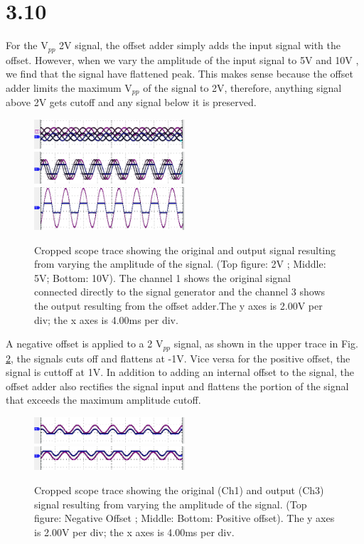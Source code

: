 \documentclass[authoryear, 12pt,5p, times]{elsarticle}
\begin{document}
\section*{3.10}
For the V$_{pp}$ 2V signal, the offset adder simply adds the input signal with the offset. However, when we vary the amplitude of the input signal to 5V and 10V , we find that the signal have flattened peak. This makes sense because the offset adder limits the maximum V$_{pp}$ of the signal to 2V, therefore, anything signal above 2V gets cutoff and any signal below it is preserved. 
\begin{figure}[h!]
\center
\includegraphics[width=0.5\textwidth]{figure/3_10_12}
\includegraphics[width=0.5\textwidth]{figure/3_10_13}
\includegraphics[width=0.5\textwidth]{figure/3_10_14}
\caption{Cropped scope trace showing the original and output signal resulting from varying the amplitude of the signal. (Top figure: 2V ; Middle: 5V; Bottom: 10V). The channel 1 shows the original signal connected directly to the signal generator and the channel 3 shows the output resulting from the offset adder.The y axes is 2.00V per div; the x axes is 4.00ms per div.}
\label{3_10_12}
\end{figure}
\par A negative offset is applied to a 2 V$_{pp}$ signal, as shown in the upper trace in Fig. \ref{plus_neg}, the signals cuts off and flattens at -1V.  Vice versa for the positive offset, the signal is cuttoff at 1V. In addition to adding an internal offset to the signal, the offset adder also rectifies the signal input and flattens the portion of the signal that exceeds the maximum amplitude cutoff. 
\begin{figure}[h!]
\center
\includegraphics[width=0.5\textwidth]{figure/3_10_17}
\includegraphics[width=0.5\textwidth]{figure/3_10_16}
\caption{Cropped scope trace showing the original (Ch1) and output (Ch3) signal resulting from varying the amplitude of the signal. (Top figure: Negative Offset ; Middle: Bottom: Positive offset). The y axes is 2.00V per div; the x axes is 4.00ms per div.}
\label{plus_neg}
\end{figure}
\end{document}
